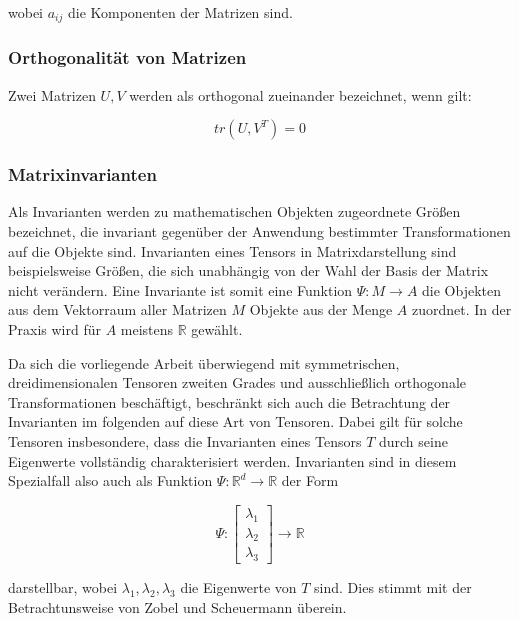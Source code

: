 \documentclass[a4paper,fontsize=12pt,toc=bib,halfparskip,ngerman]{scrartcl}
\begin{document}
wobei $a_{ij}$ die Komponenten der Matrizen sind.

\subsubsection{Orthogonalit\"at von Matrizen}
Zwei Matrizen $U,V$ werden als orthogonal zueinander bezeichnet, wenn \cite{ennis2006orthogonal} gilt:

\begin{equation}
tr(U,V^{T}) = 0
\end{equation}

\subsubsection{Matrixinvarianten}
\label{Matrixinvarianten}
Als Invarianten werden zu mathematischen Objekten zugeordnete Gr\"o{\ss}en bezeichnet, die invariant gegen\"uber der Anwendung bestimmter Transformationen auf die Objekte sind. Invarianten eines Tensors in Matrixdarstellung sind beispielsweise Gr\"o{\ss}en, die sich unabh\"angig von der Wahl der Basis der Matrix nicht ver\"andern\cite{ennis2006orthogonal}. Eine Invariante ist somit eine Funktion $\Psi: M \rightarrow A$ die Objekten aus dem Vektorraum aller Matrizen $M$ Objekte aus der Menge $A$ zuordnet. In der Praxis wird f\"ur $A$ meistens $\mathbb{R}$ gew\"ahlt.

Da sich die vorliegende Arbeit \"uberwiegend mit symmetrischen, dreidimensionalen Tensoren zweiten Grades und ausschlie{\ss}lich orthogonale Transformationen besch\"aftigt, beschr\"ankt sich auch die Betrachtung der Invarianten im folgenden auf diese Art von Tensoren. Dabei gilt f\"ur solche Tensoren insbesondere, dass die Invarianten eines Tensors $T$ durch seine Eigenwerte vollst\"andig charakterisiert werden. Invarianten sind in diesem Spezialfall also auch als Funktion $\Psi: \mathbb{R}^d \rightarrow \mathbb{R}$ der Form

\begin{equation}
	\Psi:
	\begin{bmatrix}
	\lambda_1\\
	\lambda_2\\
	\lambda_3
	\end{bmatrix}
	\rightarrow \mathbb{R}
\end{equation}

darstellbar, wobei $\lambda_1, \lambda_2, \lambda_3$ die Eigenwerte von $T$ sind. Dies stimmt mit der Betrachtunsweise von Zobel und Scheuermann \cite{zobel2017extremal} \"uberein.
\end{document}
